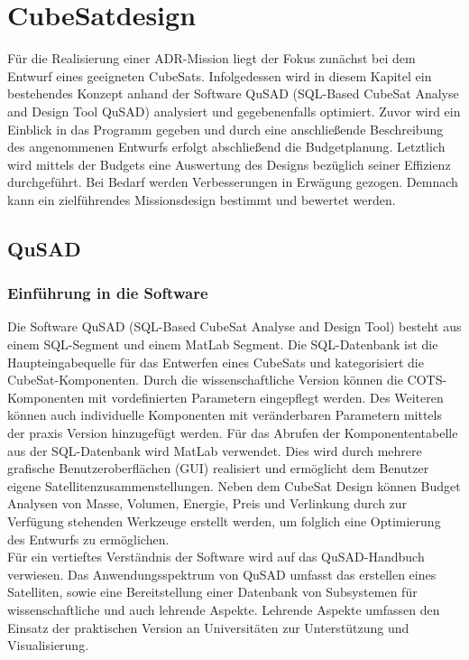 \chapter{CubeSatdesign}
Für die Realisierung einer ADR-Mission liegt der Fokus zunächst bei dem Entwurf eines geeigneten CubeSats. Infolgedessen wird in diesem Kapitel ein bestehendes Konzept \cite{Lettau.} anhand der Software QuSAD (SQL-Based CubeSat Analyse and Design Tool QuSAD) analysiert und gegebenenfalls optimiert. Zuvor wird ein Einblick in das Programm gegeben und durch eine anschließende Beschreibung des angenommenen Entwurfs erfolgt abschließend die Budgetplanung. Letztlich wird mittels der Budgets eine Auswertung des Designs bezüglich seiner Effizienz durchgeführt. Bei Bedarf werden Verbesserungen in Erwägung gezogen. Demnach kann ein zielführendes Missionsdesign bestimmt und bewertet werden.
		\section{QuSAD}
			\subsection{Einführung in die Software}
Die Software QuSAD (SQL-Based CubeSat Analyse and Design Tool) besteht aus einem SQL-Segment und einem MatLab Segment. Die SQL-Datenbank ist die Haupteingabequelle für das Entwerfen eines CubeSats und kategorisiert die CubeSat-Komponenten. Durch die wissenschaftliche Version können die COTS-Komponenten mit vordefinierten Parametern eingepflegt werden. Des Weiteren können auch individuelle Komponenten mit veränderbaren Parametern mittels der praxis Version hinzugefügt werden. Für das Abrufen der Komponententabelle aus der SQL-Datenbank wird MatLab verwendet. Dies wird durch mehrere grafische Benutzeroberflächen (GUI) realisiert und ermöglicht dem Benutzer eigene Satellitenzusammenstellungen. Neben dem CubeSat Design können Budget Analysen von Masse, Volumen, Energie, Preis und Verlinkung durch zur Verfügung stehenden Werkzeuge erstellt werden, um folglich eine Optimierung des Entwurfs zu ermöglichen. \cite{Farahvashi.2016b} \\
Für ein vertieftes Verständnis der Software wird auf das QuSAD-Handbuch \cite{Farahvashi.2016} verwiesen. Das Anwendungsspektrum von QuSAD umfasst das erstellen eines Satelliten, sowie eine Bereitstellung einer Datenbank von Subsystemen für wissenschaftliche und auch lehrende Aspekte. Lehrende Aspekte umfassen den Einsatz der praktischen Version an Universitäten zur Unterstützung und Visualisierung. \cite{Farahvashi.2016b}
